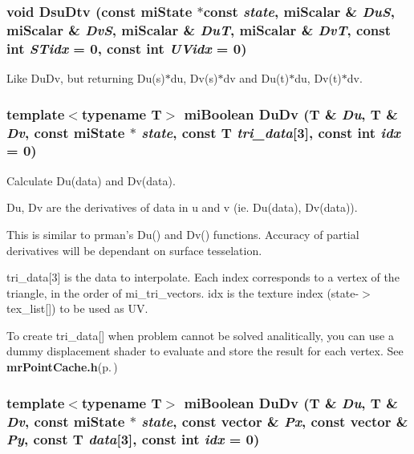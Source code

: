 \subsubsection{\setlength{\rightskip}{0pt plus 5cm}void Dsu\-Dtv (const mi\-State $\ast$const {\em state}, mi\-Scalar \& {\em Du\-S}, mi\-Scalar \& {\em Dv\-S}, mi\-Scalar \& {\em Du\-T}, mi\-Scalar \& {\em Dv\-T}, const int {\em STidx} = 0, const int {\em UVidx} = 0)\hspace{0.3cm}{\tt  [inline]}}\label{namespacemr_a46}


Like Du\-Dv, but returning Du(s)$\ast$du, Dv(s)$\ast$dv and Du(t)$\ast$du, Dv(t)$\ast$dv. 

\subsubsection{\setlength{\rightskip}{0pt plus 5cm}template$<$typename T$>$ mi\-Boolean Du\-Dv (T \& {\em Du}, T \& {\em Dv}, const mi\-State $\ast$ {\em state}, const T {\em tri\_\-data}[3], const int {\em idx} = 0)\hspace{0.3cm}{\tt  [inline]}}\label{namespacemr_a45}


Calculate Du(data) and Dv(data).

Du, Dv are the derivatives of data in u and v (ie. Du(data), Dv(data)).

This is similar to prman's Du() and Dv() functions. Accuracy of partial derivatives will be dependant on surface tesselation.

tri\_\-data[3] is the data to interpolate. Each index corresponds to a vertex of the triangle, in the order of mi\_\-tri\_\-vectors. idx is the texture index (state-$>$tex\_\-list[]) to be used as UV.

To create tri\_\-data[] when problem cannot be solved analitically, you can use a dummy displacement shader to evaluate and store the result for each vertex. See {\bf mr\-Point\-Cache.h}{\rm (p.\,\pageref{mrPointCache_8h})} 
\subsubsection{\setlength{\rightskip}{0pt plus 5cm}template$<$typename T$>$ mi\-Boolean Du\-Dv (T \& {\em Du}, T \& {\em Dv}, const mi\-State $\ast$ {\em state}, const vector \& {\em Px}, const vector \& {\em Py}, const T {\em data}[3], const int {\em idx} = 0)\hspace{0.3cm}{\tt  [inline]}}\label{namespacemr_a44}


